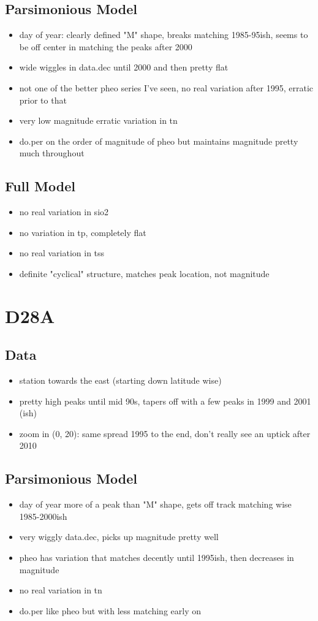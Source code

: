 \documentclass[12pt]{amsart}
\begin{document}
\subsection{Parsimonious Model}
\begin{itemize}
\item day of year: clearly defined "M" shape, breaks matching 1985-95ish, seems to be off center in matching the peaks after 2000
\item wide wiggles in data.dec until 2000 and then pretty flat
\item not one of the better pheo series I've seen, no real variation after 1995, erratic prior to that
\item very low magnitude erratic variation in tn
\item do.per on the order of magnitude of pheo but maintains magnitude pretty much throughout
\end{itemize}
\subsection{Full Model}
\begin{itemize}
\item no real variation in sio2
\item no variation in tp, completely flat
\item no real variation in tss
\item definite "cyclical" structure, matches peak location, not magnitude
\end{itemize}

\section{D28A}
\subsection{Data}
\begin{itemize}
\item station towards the east (starting down latitude wise)
\item pretty high peaks until mid 90s, tapers off with a few peaks in 1999 and 2001 (ish)
\item zoom in (0, 20): same spread 1995 to the end, don't really see an uptick after 2010
\end{itemize}
\subsection{Parsimonious Model}
\begin{itemize}
\item day of year more of a peak than "M" shape, gets off track matching wise 1985-2000ish
\item very wiggly data.dec, picks up magnitude pretty well
\item pheo has variation that matches decently until 1995ish, then decreases in magnitude
\item no real variation in tn
\item do.per like pheo but with less matching early on
\end{itemize}
\end{document}
